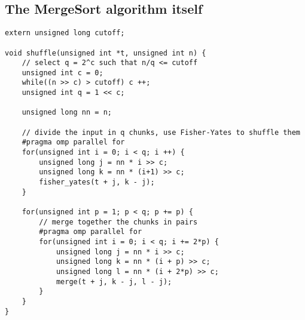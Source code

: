 \documentclass[letter,11pt,en]{quick-document}
\begin{document}
\subsection{The MergeSort algorithm itself}

\begin{lstlisting}
extern unsigned long cutoff;

void shuffle(unsigned int *t, unsigned int n) {
    // select q = 2^c such that n/q <= cutoff
    unsigned int c = 0;
    while((n >> c) > cutoff) c ++;
    unsigned int q = 1 << c;

    unsigned long nn = n;

    // divide the input in q chunks, use Fisher-Yates to shuffle them
    #pragma omp parallel for
    for(unsigned int i = 0; i < q; i ++) {
        unsigned long j = nn * i >> c;
        unsigned long k = nn * (i+1) >> c;
        fisher_yates(t + j, k - j);
    }

    for(unsigned int p = 1; p < q; p += p) {
        // merge together the chunks in pairs
        #pragma omp parallel for
        for(unsigned int i = 0; i < q; i += 2*p) {
            unsigned long j = nn * i >> c;
            unsigned long k = nn * (i + p) >> c;
            unsigned long l = nn * (i + 2*p) >> c;
            merge(t + j, k - j, l - j);
        }
    }
}
\end{lstlisting}
\end{document}

